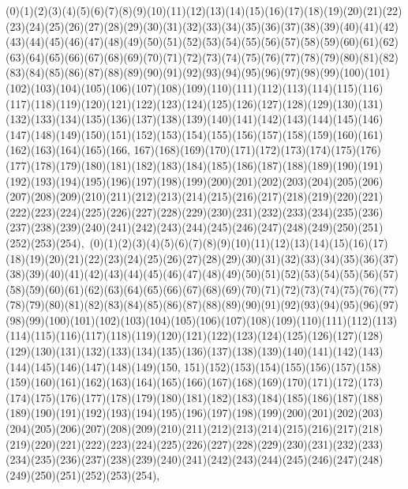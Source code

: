 \documentclass[12pt]{article}
\begin{document}
{(0)(1)(2)(3)(4)(5)(6)(7)(8)(9)(10)(11)(12)(13)(14)(15)(16)(17)(18)(19)(20)(21)(22)(23)(24)(25)(26)(27)(28)(29)(30)(31)(32)(33)(34)(35)(36)(37)(38)(39)(40)(41)(42)(43)(44)(45)(46)(47)(48)(49)(50)(51)(52)(53)(54)(55)(56)(57)(58)(59)(60)(61)(62)(63)(64)(65)(66)(67)(68)(69)(70)(71)(72)(73)(74)(75)(76)(77)(78)(79)(80)(81)(82)(83)(84)(85)(86)(87)(88)(89)(90)(91)(92)(93)(94)(95)(96)(97)(98)(99)(100)(101)(102)(103)(104)(105)(106)(107)(108)(109)(110)(111)(112)(113)(114)(115)(116)(117)(118)(119)(120)(121)(122)(123)(124)(125)(126)(127)(128)(129)(130)(131)(132)(133)(134)(135)(136)(137)(138)(139)(140)(141)(142)(143)(144)(145)(146)(147)(148)(149)(150)(151)(152)(153)(154)(155)(156)(157)(158)(159)(160)(161)(162)(163)(164)(165)(166, 167)(168)(169)(170)(171)(172)(173)(174)(175)(176)(177)(178)(179)(180)(181)(182)(183)(184)(185)(186)(187)(188)(189)(190)(191)(192)(193)(194)(195)(196)(197)(198)(199)(200)(201)(202)(203)(204)(205)(206)(207)(208)(209)(210)(211)(212)(213)(214)(215)(216)(217)(218)(219)(220)(221)(222)(223)(224)(225)(226)(227)(228)(229)(230)(231)(232)(233)(234)(235)(236)(237)(238)(239)(240)(241)(242)(243)(244)(245)(246)(247)(248)(249)(250)(251)(252)(253)(254)$
, 
$
(0)(1)(2)(3)(4)(5)(6)(7)(8)(9)(10)(11)(12)(13)(14)(15)(16)(17)(18)(19)(20)(21)(22)(23)(24)(25)(26)(27)(28)(29)(30)(31)(32)(33)(34)(35)(36)(37)(38)(39)(40)(41)(42)(43)(44)(45)(46)(47)(48)(49)(50)(51)(52)(53)(54)(55)(56)(57)(58)(59)(60)(61)(62)(63)(64)(65)(66)(67)(68)(69)(70)(71)(72)(73)(74)(75)(76)(77)(78)(79)(80)(81)(82)(83)(84)(85)(86)(87)(88)(89)(90)(91)(92)(93)(94)(95)(96)(97)(98)(99)(100)(101)(102)(103)(104)(105)(106)(107)(108)(109)(110)(111)(112)(113)(114)(115)(116)(117)(118)(119)(120)(121)(122)(123)(124)(125)(126)(127)(128)(129)(130)(131)(132)(133)(134)(135)(136)(137)(138)(139)(140)(141)(142)(143)(144)(145)(146)(147)(148)(149)(150, 151)(152)(153)(154)(155)(156)(157)(158)(159)(160)(161)(162)(163)(164)(165)(166)(167)(168)(169)(170)(171)(172)(173)(174)(175)(176)(177)(178)(179)(180)(181)(182)(183)(184)(185)(186)(187)(188)(189)(190)(191)(192)(193)(194)(195)(196)(197)(198)(199)(200)(201)(202)(203)(204)(205)(206)(207)(208)(209)(210)(211)(212)(213)(214)(215)(216)(217)(218)(219)(220)(221)(222)(223)(224)(225)(226)(227)(228)(229)(230)(231)(232)(233)(234)(235)(236)(237)(238)(239)(240)(241)(242)(243)(244)(245)(246)(247)(248)(249)(250)(251)(252)(253)(254)$
, 
$
}
\end{document}
